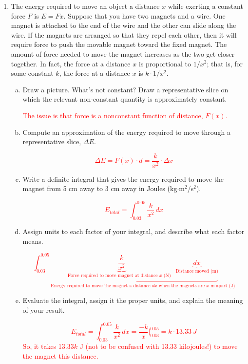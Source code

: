 \documentclass[12pt]{article}
\newcommand{\red}[1]{ \textcolor{red}{#1 } }
\begin{document}
\begin{enumerate}
\begin{enumerate}[(a)]
\end{enumerate}
\item The energy required to move an object a distance \(x\) while exerting a constant force \(F\) is \(E = Fx\).  Suppose that you have two magnets and a wire. One magnet is attached to the end of the wire and the other can slide along the wire. If the magnets are arranged so that they repel each other, then it will require force to push the movable magnet toward the fixed magnet. The amount of force needed to move the magnet increases as the two get closer together. In fact, the force at a distance \(x\) is proportional to \(1/x^2\); that is, for some constant $k$, the force at a distance $x$ is $k\cdot 1/x^2$.
\begin{enumerate}[(a)]
\item Draw a picture. What's not constant? Draw a representative slice on which the relevant non-constant quantity is approximately constant. 

\red{The issue is that force is a nonconstant function of distance, $F(x)$.}

\item Compute an approximation of the energy required to move through a representative slice, $\Delta E$.

\red{
\[\Delta E = F(x)\cdot d =  \frac{k}{x^2}\cdot\Delta x\]
}
\item Write a definite integral that gives the energy required to move the magnet from 5 cm away to 3 cm away in Joules (kg\(\cdot\)m\(^2\)/s\(^2\)).

\red{
\[E_{total} = \int_{0.03}^{0.05} \frac{k}{x^2}\,dx\]
}

\item Assign units to each factor of your integral, and describe what each factor means.

\red{
\[\int_{0.03}^{0.05} \underbrace{ \underbrace{\frac{k}{x^2}}_{\text{Force required to move magnet at distance \(x\) (N)}\quad } \underbrace{dx}_{\text{Distance moved (m)} } }_{ \text{Energy required to move the magnet a distance \(dx\) when the magnets are \(x\) m apart (J)} }\]
}

\item Evaluate the integral, assign it the proper units, and explain the meaning of your result.

\red{
\[E_{total} = \int_{0.03}^{0.05} \frac{k}{x^2}\,dx = \frac{-k}{x}\bigg|_{0.03}^{0.05} = k\cdot\SI{13.33}{J}\]
So, it takes 13.33$k$ J (not to be confused with 13.33 kilojoules!) to move the magnet this distance.
}


\end{enumerate}
\end{enumerate}
\end{document}
